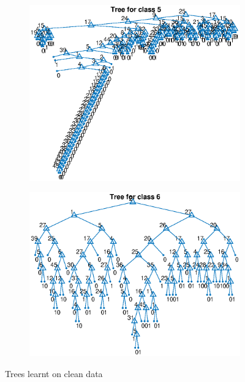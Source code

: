 \documentclass{article}
\begin{document}
\begin{figure}
\begin{subfigure}[b]{.49\textwidth}
   \includegraphics[width=\textwidth]{tree5.eps}
 \end{subfigure}
 \begin{subfigure}[b]{.49\textwidth}
   \includegraphics[width=\textwidth]{tree6.eps}
 \end{subfigure}
 \caption{Trees learnt on clean data}
 \label{fig:trees}
\end{figure}
\end{document}
